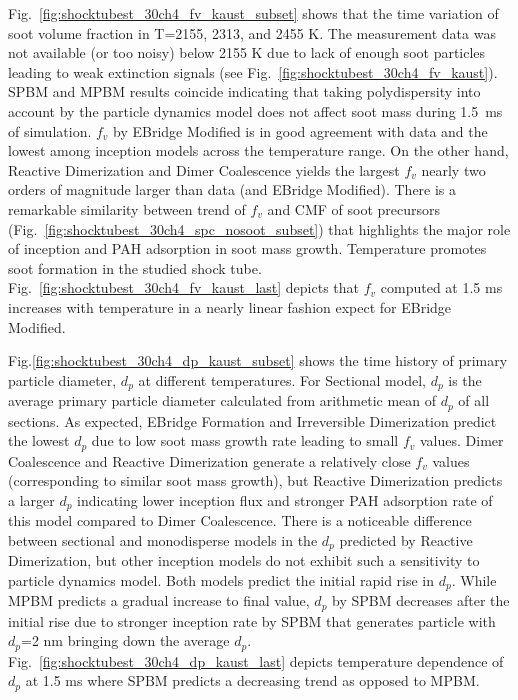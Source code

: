 Fig.~\ref{fig:shocktubest_30ch4_fv_kaust_subset} shows that the time variation of soot volume fraction in T=2155, 2313, and 2455 K. The measurement data was not available (or too noisy) below 2155 K due to lack of enough soot particles leading to weak extinction signals (see Fig.~\ref{fig:shocktubest_30ch4_fv_kaust}). SPBM and MPBM results coincide indicating that taking polydispersity into account by the particle dynamics model does not affect soot mass during 1.5~ms of simulation. $f_v$ by EBridge Modified is in good agreement with data and the lowest among inception models across the temperature range. On the other hand, Reactive Dimerization and Dimer Coalescence yields the largest $f_v$ nearly two orders of magnitude larger than data (and EBridge Modified). There is a remarkable similarity between trend of $f_v$ and CMF of soot precursors (Fig.~\ref{fig:shocktubest_30ch4_spc_nosoot_subset}) that highlights the major role of inception and PAH adsorption in soot mass growth. Temperature promotes soot formation in the studied shock tube. Fig.~\ref{fig:shocktubest_30ch4_fv_kaust_last} depicts that $f_v$ computed at 1.5 ms increases with temperature in a nearly linear fashion expect for EBridge Modified.

Fig.\ref{fig:shocktubest_30ch4_dp_kaust_subset} shows the time history of primary particle diameter, $d_p$ at different temperatures. For Sectional model, $d_p$ is the average primary particle diameter calculated from arithmetic mean of $d_p$ of all sections. As expected, EBridge Formation and Irreversible Dimerization predict the lowest $d_p$ due to low soot mass growth rate leading to small $f_v$ values. Dimer Coalescence and Reactive Dimerization generate a relatively close $f_v$ values (corresponding to similar soot mass growth), but Reactive Dimerization predicts a larger $d_p$ indicating lower inception flux and stronger PAH adsorption rate of this model compared to Dimer Coalescence. There is a noticeable difference between sectional and monodisperse models in the $d_p$ predicted by Reactive Dimerization, but other inception models do not exhibit such a sensitivity to particle dynamics model. Both models predict the initial rapid rise in $d_p$. While MPBM predicts a gradual increase to final value, $d_p$ by SPBM decreases after the initial rise due to stronger inception rate by SPBM that generates particle with $d_p$=2 nm bringing down the average $d_p$. Fig.~\ref{fig:shocktubest_30ch4_dp_kaust_last} depicts temperature dependence of $d_p$ at 1.5 ms where SPBM predicts a decreasing trend as opposed to MPBM.

